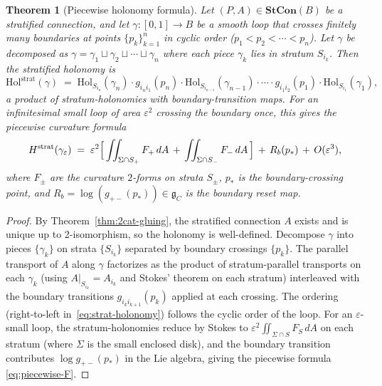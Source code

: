 \documentclass[11pt,a4paper]{article}
\theoremstyle{plain}
\newtheorem{theorem}{Theorem}[section]
\theoremstyle{definition}
\theoremstyle{remark}
\begin{document}
\begin{theorem}[Piecewise holonomy formula]
\label{thm:stratified-holonomy}
Let $(P, A) \in \mathbf{StCon}(B)$ be a stratified connection, and let
$\gamma : [0, 1] \to B$ be a smooth loop that crosses finitely many
boundaries at points $\{p_k\}_{k=1}^n$ in cyclic order
($p_1 < p_2 < \cdots < p_n$). Let $\gamma$ be decomposed as
$\gamma = \gamma_1 \sqcup \gamma_2 \sqcup \cdots \sqcup \gamma_n$
where each piece $\gamma_k$ lies in stratum $S_{i_k}$. Then the
stratified holonomy is
\begin{equation}\label{eq:strat-holonomy}
  \mathrm{Hol}^{\mathrm{strat}}(\gamma) \;=\;
  \mathrm{Hol}_{S_{i_n}}(\gamma_n) \cdot g_{i_n i_1}(p_n) \cdot
  \mathrm{Hol}_{S_{i_{n-1}}}(\gamma_{n-1}) \cdot \cdots \cdot
  g_{i_1 i_2}(p_1) \cdot \mathrm{Hol}_{S_{i_1}}(\gamma_1),
\end{equation}
a product of stratum-holonomies with boundary-transition maps.
For an infinitesimal small loop of area $\varepsilon^2$ crossing the
boundary once, this gives the piecewise curvature formula
\begin{equation}\label{eq:piecewise-F}
  H^{\mathrm{strat}}(\gamma_\varepsilon) \;=\;
  \varepsilon^2 \Bigl[\,\iint_{\Sigma \cap S_+} F_+\, dA \,+\,
  \iint_{\Sigma \cap S_-} F_-\, dA\,\Bigr] \,+\, R_b(p_*) \,+\,
  O(\varepsilon^3),
\end{equation}
where $F_\pm$ are the curvature $2$-forms on strata $S_\pm$, $p_*$ is
the boundary-crossing point, and $R_b = \log(g_{+-}(p_*)) \in
\mathfrak{g}_C$ is the boundary reset map.
\end{theorem}

\begin{proof}
By Theorem~\ref{thm:2cat-gluing}, the stratified connection $A$ exists
and is unique up to 2-isomorphism, so the holonomy is well-defined.
Decompose $\gamma$ into pieces $\{\gamma_k\}$ on strata $\{S_{i_k}\}$
separated by boundary crossings $\{p_k\}$. The parallel transport
of $A$ along $\gamma$ factorizes as the product of stratum-parallel
transports on each $\gamma_k$ (using $A|_{S_{i_k}} = A_{i_k}$ and
Stokes' theorem on each stratum) interleaved with the boundary
transitions $g_{i_k i_{k+1}}(p_k)$ applied at each crossing. The
ordering (right-to-left in~\eqref{eq:strat-holonomy}) follows the
cyclic order of the loop. For an $\varepsilon$-small loop, the
stratum-holonomies reduce by Stokes to $\varepsilon^2 \iint_{\Sigma
\cap S} F_S\, dA$ on each stratum (where $\Sigma$ is the small
enclosed disk), and the boundary transition contributes
$\log g_{+-}(p_*)$ in the Lie algebra, giving the piecewise formula
\eqref{eq:piecewise-F}.
\end{proof}
\end{document}
